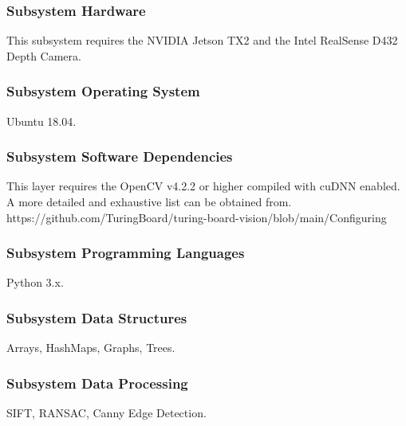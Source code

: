 \subsubsection{Subsystem Hardware}
This subsystem requires the NVIDIA Jetson TX2 and the Intel RealSense  D432 Depth Camera.

\subsubsection{Subsystem Operating System}
Ubuntu 18.04.  

\subsubsection{Subsystem Software Dependencies}
This layer requires the OpenCV v4.2.2 or higher compiled with cuDNN enabled. A more detailed and exhaustive list can be obtained from. https://github.com/TuringBoard/turing-board-vision/blob/main/Configuring%


\subsubsection{Subsystem Programming Languages}
Python 3.x.

\subsubsection{Subsystem Data Structures}
Arrays, HashMaps, Graphs, Trees.

\subsubsection{Subsystem Data Processing}
SIFT, RANSAC, Canny Edge Detection.


